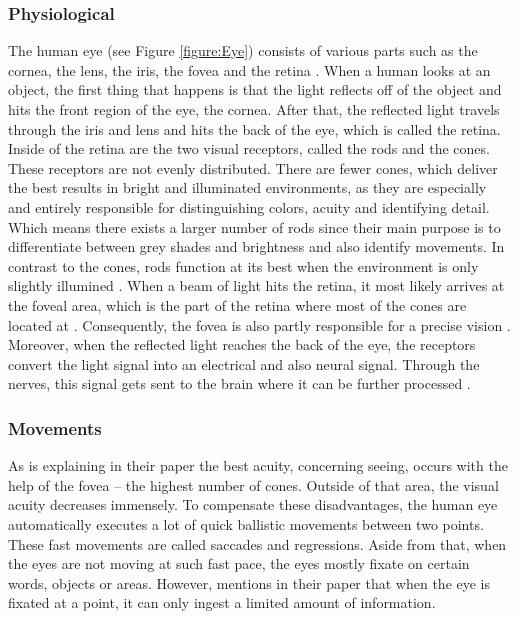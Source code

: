 \subsubsection{Physiological}
The human eye (see Figure \ref{figure:Eye}) consists of various parts such as the cornea, the lens, the iris, the fovea and the retina \autocite{djamasbi2014eye}. When a human looks at an object, the first thing that happens is that the light reflects off of the object and hits the front region of the eye, the cornea. After that, the reflected light travels through the iris and lens and hits the back of the eye, which is called the retina. Inside of the retina are the two visual receptors, called the rods and the cones. These receptors are not evenly distributed. There are fewer cones, which deliver the best results in bright and illuminated environments, as they are especially and entirely responsible for distinguishing colors, acuity and identifying detail. Which means there exists a larger number of rods since their main purpose is to differentiate between grey shades and brightness and also identify movements. In contrast to the cones, rods function at its best when the environment is only slightly illumined \autocite{djamasbi2014eye, biedert2010eyebook}.
When a beam of light hits the retina, it most likely arrives at the foveal area, which is the part of the retina where most of the cones are located at \autocite{djamasbi2014eye}. Consequently, the fovea is also partly responsible for a precise vision \autocite{biedert2010eyebook}.
Moreover, when the reflected light reaches the back of the eye, the receptors convert the light signal into an electrical and also neural signal. Through the nerves, this signal gets sent to the brain where it can be further processed \autocite{djamasbi2014eye}.

\subsubsection{Movements}
As \textcite{djamasbi2014eye} is explaining in their paper the best acuity, concerning seeing, occurs with the help of the fovea -- the highest number of cones. Outside of that area, the visual acuity decreases immensely. To compensate these disadvantages, the human eye automatically executes a lot of quick ballistic movements between two points. These fast movements are called saccades and regressions.
Aside from that, when the eyes are not moving at such fast pace, the eyes mostly fixate on certain words, objects or areas. However, \textcite{biedert2010eyebook} mentions in their paper that when the eye is fixated at a point, it can only ingest a limited amount of information.

